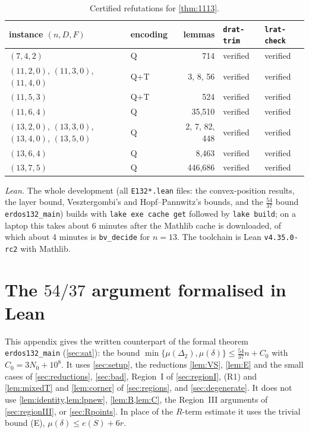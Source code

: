\documentclass[11pt]{amsart}
\theoremstyle{definition}
\theoremstyle{remark}
\newcommand{\Dt}{\Delta_2}
\newcommand{\mult}{\mu}
\begin{document}
\begin{table}[ht]
\centering
\renewcommand{\arraystretch}{1.15}
\begin{tabular}{@{}llrll@{}}
\toprule
instance $(n,D,F)$ & encoding & lemmas & \texttt{drat-trim} & \texttt{lrat-check}\\
\midrule
$(7,4,2)$ & Q & 714 & verified & verified\\
$(11,2,0)$, $(11,3,0)$, $(11,4,0)$ & Q+T & 3, 8, 56 & verified & verified\\
$(11,5,3)$ & Q+T & 524 & verified & verified\\
$(11,6,4)$ & Q & 35,510 & verified & verified\\
$(13,2,0)$, $(13,3,0)$, $(13,4,0)$, $(13,5,0)$ & Q & 2, 7, 82, 448 & verified & verified\\
$(13,6,4)$ & Q & 8,463 & verified & verified\\
$(13,7,5)$ & Q & 446,686 & verified & verified\\
\bottomrule
\end{tabular}
\caption{Certified refutations for \cref{thm:1113}.}
\end{table}

\emph{Lean.} The whole development (all \texttt{E132*.lean} files: the convex-position results, the layer bound, Vesztergombi's and Hopf--Pannwitz's bounds, and the $\frac{54}{37}$ bound \texttt{erdos132\_main}) builds with \texttt{lake exe cache get} followed by \texttt{lake build}; on a laptop this takes about 6 minutes after the Mathlib cache is downloaded, of which about 4 minutes is \texttt{bv\_decide} for $n=13$. The toolchain is Lean \texttt{v4.35.0-rc2} with Mathlib.

\section{The \texorpdfstring{$54/37$}{54/37} argument formalised in Lean}\label{app:lean54}

This appendix gives the written counterpart of the formal theorem \texttt{erdos132\_main} (\cref{sec:sat}): the bound $\min\{\mult(\Dt),\mult(\delta)\}\le\frac{54}{37}n+C_0$ with $C_0=3N_0+10^8$. It uses \cref{sec:setup}, the reductions \cref{lem:VS}, \cref{lem:E} and the small cases of \cref{sec:reductions}, \cref{sec:bad}, Region~I of \cref{sec:regionI}, (R1) and \cref{lem:mixedT} and \cref{lem:corner} of \cref{sec:regions}, and \cref{sec:degenerate}. It does not use \cref{lem:identity,lem:lpnew}, \cref{lem:B,lem:C}, the Region~III arguments of \cref{sec:regionIII}, or \cref{sec:Rpoints}. In place of the $R$-term estimate it uses the trivial bound (E), $\mult(\delta)\le e(S)+6r$.
\end{document}
